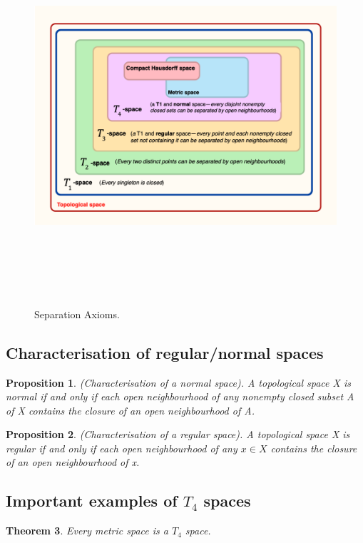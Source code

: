 \documentclass[twoside]{article}
\newcounter{lecnum}
\newtheorem{theorem}{Theorem}[lecnum]
\newtheorem{proposition}[theorem]{Proposition}
\begin{document}
\begin{figure}
\includegraphics[height=14cm, width=17cm]{Separation-Axioms}
\caption{Separation Axioms.}
\end{figure}

\subsection{Characterisation of regular/normal spaces}
\begin{proposition}(Characterisation of a normal space). A topological space X is normal if and only if each open neighbourhood of any nonempty closed subset A of X contains the closure of an open neighbourhood of A.
\end{proposition}

\begin{proposition}(Characterisation of a regular space). A topological space X is regular if and only if each open neighbourhood of any $x \in X$ contains the closure of an open neighbourhood of x. 
\end{proposition}


\subsection{Important examples of $T_4$ spaces}
\begin{theorem}Every metric space is a $T_4$ space.
\end{theorem}
\end{document}
